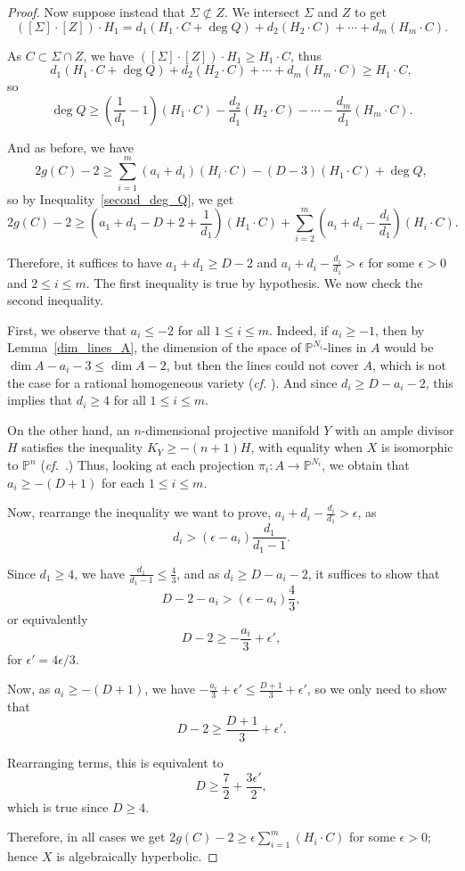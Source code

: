 \documentclass[10pt,a4paper]{article}
\numberwithin{equation}{section}
\theoremstyle{definition}
\theoremstyle{remark}
\renewcommand{\P}{\mathbb{P}}
\begin{document}
\begin{proof}
Now suppose  instead that $\Sigma \not \subset Z$. We intersect $\Sigma$ and $Z$ to get
\[ ([\Sigma]\cdot [Z])\cdot H_1 = d_1(H_1\cdot C + \deg Q) + d_2(H_2\cdot C) + \cdots + d_m(H_m\cdot C). \]

As $C\subset \Sigma \cap Z$, we have $([\Sigma]\cdot [Z])\cdot H_1\ge H_1\cdot C$, thus
\[ d_1(H_1\cdot C + \deg Q) + d_2(H_2\cdot C) + \cdots + d_m(H_m\cdot C)\ge H_1\cdot C, \]
so
\begin{equation}\label{second_deg_Q}
    \deg Q\ge \left (\frac{1}{d_1}-1\right )(H_1\cdot C) - \frac{d_2}{d_1}(H_2\cdot C) - \cdots - \frac{d_m}{d_1}(H_m\cdot C).
\end{equation}

And as before, we have
\[ 2g(C) - 2\ge \sum_{i=1}^m(a_i+d_i)(H_i\cdot C) - (D-3)(H_1\cdot C) + \deg Q, \]
so by Inequality~\eqref{second_deg_Q}, we get
\[ 2g(C)-2\ge \left (a_1+d_1-D+2+\frac{1}{d_1}\right )(H_1\cdot C) + \sum_{i=2}^m\left (a_i+d_i-\frac{d_i}{d_1}\right )(H_i\cdot C). \]

Therefore, it suffices to have $a_1+d_1\ge D-2$ and $a_i+d_i-\frac{d_i}{d_1}>\epsilon$ for some $\epsilon > 0$ and $2\le i\le m$. The first inequality is true by hypothesis. We now check the second inequality.

First, we observe that $a_i\le -2$ for all $1\le i\le m$. Indeed, if $a_i\ge -1$, then by Lemma~\ref{dim_lines_A}, the dimension of the space of $\P^{N_i}$-lines in $A$ would be $\dim A-a_i-3\le \dim A-2$, but then the lines could not cover $A$, which is not the case for a rational homogeneous variety (\textit{cf.} \cite[Theorem 1.5 and the following paragraph]{Man20}). And since $d_i\ge D-a_i-2$, this implies that $d_i\ge 4$ for all $1\le i\le m$.

On the other hand, an $n$-dimensional projective manifold $Y$ with an ample divisor $H$ satisfies the inequality $K_Y \ge -(n+1)H$, with equality when $X$ is isomorphic to $\P^n$ (\textit{cf.}~\cite{KO73}.) Thus, looking at each projection $\pi_i\colon A\to \P^{N_i}$, we obtain that $a_i \ge -(D+1)$ for each $1\le i\le m$.

Now, rearrange the inequality we want to prove, $a_i+d_i-\frac{d_i}{d_1}>\epsilon$, as 
\[ d_i > (\epsilon - a_i)\frac{d_1}{d_1-1}. \]

Since $d_1\ge 4$, we have $\frac{d_1}{d_1-1}\le \frac{4}{3}$, and as $d_i\ge D-a_i-2$, it suffices to show that
\[ D-2-a_i > (\epsilon - a_i)\frac{4}{3}, \]
or equivalently
\[ D-2\ge -\frac{a_i}{3} + \epsilon ', \]
for $\epsilon ' = 4\epsilon /3$.

Now, as $a_i\ge -(D+1)$, we have $-\frac{a_i}{3} + \epsilon '\le \frac{D+1}{3} + \epsilon '$, so we only need to show that
\[ D-2\ge \frac{D+1}{3} + \epsilon '. \]

Rearranging terms, this is equivalent to
\[ D\ge \frac{7}{2} + \frac{3\epsilon '}{2}, \]
which is true since $D\ge 4$.

Therefore, in all cases we get $2g(C)-2\ge \epsilon \sum_{i=1}^m(H_i\cdot C)$ for some $\epsilon > 0$; hence $X$ is algebraically hyperbolic.
\end{proof}
\end{document}
